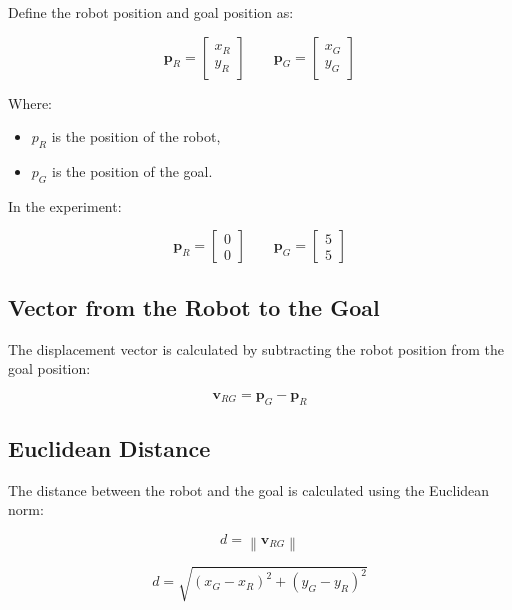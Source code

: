 \documentclass[10pt,twocolumn,a4paper]{article}
\begin{document}
Define the robot position and goal position as:

\[
\mathbf{p}_R =
\begin{bmatrix}
x_R \\
y_R
\end{bmatrix}
\qquad
\mathbf{p}_G =
\begin{bmatrix}
x_G \\
y_G
\end{bmatrix}
\]

Where:

\begin{itemize}
    \item $p_R$ is the position of the robot,
    \item $p_G$ is the position of the goal.
\end{itemize}

In the experiment:

\[
\mathbf{p}_R =
\begin{bmatrix}
0 \\
0
\end{bmatrix}
\qquad
\mathbf{p}_G =
\begin{bmatrix}
5 \\
5
\end{bmatrix}
\]

\subsection{Vector from the Robot to the Goal}

The displacement vector is calculated by subtracting the 
robot position from the goal position:

\[
\mathbf{v}_{RG} = \mathbf{p}_G - \mathbf{p}_R
\]

\subsection{Euclidean Distance}

The distance between the robot and the goal is calculated using the Euclidean norm:

\begin{equation}
    d = \left\lVert \mathbf{v}_{RG} \right\rVert
    \label{eq:robot_goal_distance_norm}
\end{equation}

\begin{equation}
    d = \sqrt{(x_G - x_R)^2 + (y_G - y_R)^2}
    \label{eq:robot_goal_distance}
\end{equation}
\end{document}

